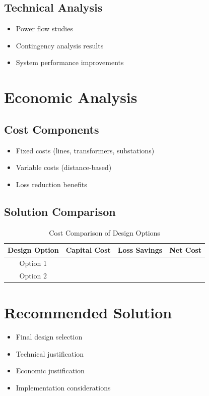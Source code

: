 \documentclass[conference]{IEEEtran}
\begin{document}
\subsection{Technical Analysis}
\begin{itemize}
	\item Power flow studies
	\item Contingency analysis results
	\item System performance improvements
\end{itemize}

\section{Economic Analysis}
\subsection{Cost Components}
\begin{itemize}
	\item Fixed costs (lines, transformers, substations)
	\item Variable costs (distance-based)
	\item Loss reduction benefits
\end{itemize}

\subsection{Solution Comparison}
\begin{table}[htbp]
	\caption{Cost Comparison of Design Options}
	\begin{center}
		\begin{tabular}{|c|c|c|c|}
			\hline
			\textbf{Design Option} & \textbf{Capital Cost} & \textbf{Loss Savings} & \textbf{Net Cost} \\
			\hline
			Option 1 & & & \\
			\hline
			Option 2 & & & \\
			\hline
		\end{tabular}
		\label{tab:costs}
	\end{center}
\end{table}

\section{Recommended Solution}
\begin{itemize}
	\item Final design selection
	\item Technical justification
	\item Economic justification
	\item Implementation considerations
\end{itemize}
\end{document}

